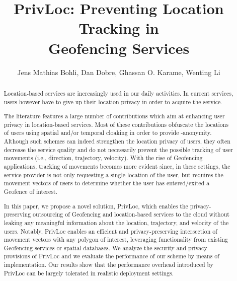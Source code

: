 \documentclass{llncs}
\newcommand\sol{{\sf PrivLoc}}
\begin{document}
\mainmatter
\title{PrivLoc: Preventing Location Tracking in \\Geofencing Services}

\author{Jens Mathias Bohli, Dan Dobre, Ghassan O. Karame, Wenting Li}



\maketitle

\begin{abstract}
Location-based services are increasingly used in our daily activities. In current services, users however have to give up their location privacy in order to acquire the service.

The literature features a large number of contributions which aim at enhancing user privacy in location-based services. Most of these contributions obfuscate the locations of users using spatial and/or temporal cloaking in order to provide -anonymity. Although such schemes can indeed strengthen the location privacy of users, they often decrease the service quality and do not necessarily prevent the possible tracking of user movements (i.e., direction, trajectory, velocity). With the rise of Geofencing
applications, tracking of movements becomes more evident since, in these settings, the service provider is not only requesting a single location of the user, but requires the movement vectors of users to determine whether the user
has entered/exited a Geofence of interest.

In this paper, we propose a novel solution, \sol, which enables the privacy-preserving outsourcing of Geofencing and location-based services to the cloud without leaking any meaningful information about the location, trajectory, and velocity of the users. Notably, \sol{} enables an efficient and privacy-preserving
intersection of movement vectors with any polygon of interest, leveraging
functionality from existing Geofencing services or spatial databases. We analyze the security and privacy provisions of \sol{} and we evaluate the performance of our scheme by means of implementation. Our results show that
the performance overhead introduced by \sol{} can be largely tolerated in realistic deployment settings.

\end{abstract}
\end{document}
